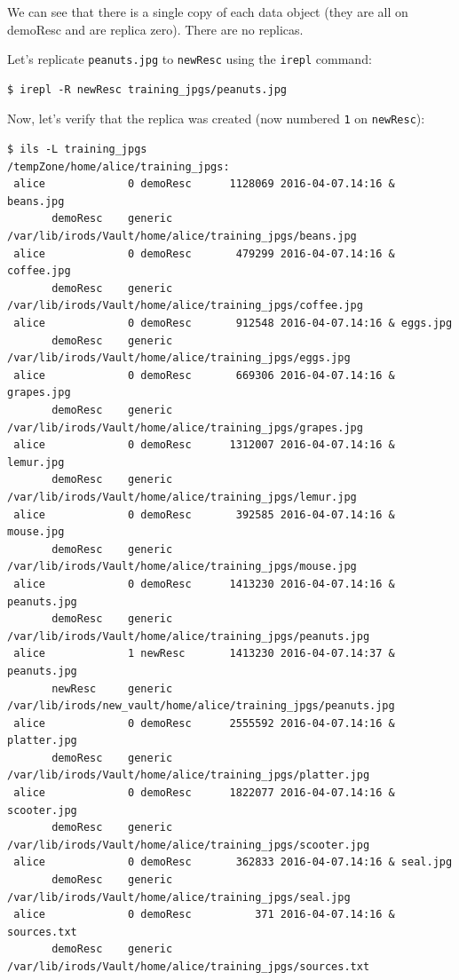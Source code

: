 \documentclass[10pt,oneside]{memoir}
\begin{document}
We can see that there is a single copy of each data object (they are all on demoResc and are replica zero). There are no replicas.

Let's replicate \texttt{peanuts.jpg} to \texttt{newResc} using the \texttt{irepl} command:

\begin{lstlisting}
$ irepl -R newResc training_jpgs/peanuts.jpg
\end{lstlisting}

Now, let's verify that the replica was created (now numbered \texttt{1} on \texttt{newResc}):

\begin{lstlisting}[basicstyle=\tiny\rmfamily]
$ ils -L training_jpgs
/tempZone/home/alice/training_jpgs:
 alice             0 demoResc      1128069 2016-04-07.14:16 & beans.jpg
       demoResc    generic    /var/lib/irods/Vault/home/alice/training_jpgs/beans.jpg
 alice             0 demoResc       479299 2016-04-07.14:16 & coffee.jpg
       demoResc    generic    /var/lib/irods/Vault/home/alice/training_jpgs/coffee.jpg
 alice             0 demoResc       912548 2016-04-07.14:16 & eggs.jpg
       demoResc    generic    /var/lib/irods/Vault/home/alice/training_jpgs/eggs.jpg
 alice             0 demoResc       669306 2016-04-07.14:16 & grapes.jpg
       demoResc    generic    /var/lib/irods/Vault/home/alice/training_jpgs/grapes.jpg
 alice             0 demoResc      1312007 2016-04-07.14:16 & lemur.jpg
       demoResc    generic    /var/lib/irods/Vault/home/alice/training_jpgs/lemur.jpg
 alice             0 demoResc       392585 2016-04-07.14:16 & mouse.jpg
       demoResc    generic    /var/lib/irods/Vault/home/alice/training_jpgs/mouse.jpg
 alice             0 demoResc      1413230 2016-04-07.14:16 & peanuts.jpg
       demoResc    generic    /var/lib/irods/Vault/home/alice/training_jpgs/peanuts.jpg
 alice             1 newResc       1413230 2016-04-07.14:37 & peanuts.jpg
       newResc     generic    /var/lib/irods/new_vault/home/alice/training_jpgs/peanuts.jpg
 alice             0 demoResc      2555592 2016-04-07.14:16 & platter.jpg
       demoResc    generic    /var/lib/irods/Vault/home/alice/training_jpgs/platter.jpg
 alice             0 demoResc      1822077 2016-04-07.14:16 & scooter.jpg
       demoResc    generic    /var/lib/irods/Vault/home/alice/training_jpgs/scooter.jpg
 alice             0 demoResc       362833 2016-04-07.14:16 & seal.jpg
       demoResc    generic    /var/lib/irods/Vault/home/alice/training_jpgs/seal.jpg
 alice             0 demoResc          371 2016-04-07.14:16 & sources.txt
       demoResc    generic    /var/lib/irods/Vault/home/alice/training_jpgs/sources.txt
\end{lstlisting}
\end{document}

